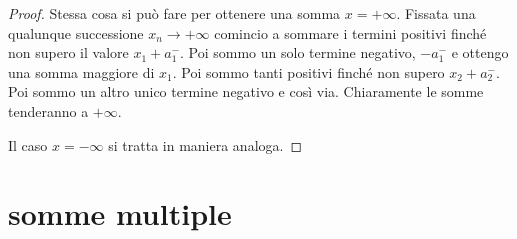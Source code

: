 \begin{proof}
Stessa cosa si può fare per ottenere una somma $x=+\infty$. Fissata una qualunque
successione $x_n \to +\infty$ comincio a sommare i termini positivi finché non supero il valore $x_1+a_1^-$. 
Poi sommo un solo termine negativo, $-a_1^-$ e ottengo una somma maggiore di $x_1$. 
Poi sommo tanti positivi finché non supero $x_2+a_2^-$. 
Poi sommo un altro unico termine negativo e così via. 
Chiaramente le somme tenderanno a $+\infty$.

Il caso $x=-\infty$ si tratta in maniera analoga.
\end{proof}

\section{somme multiple}

